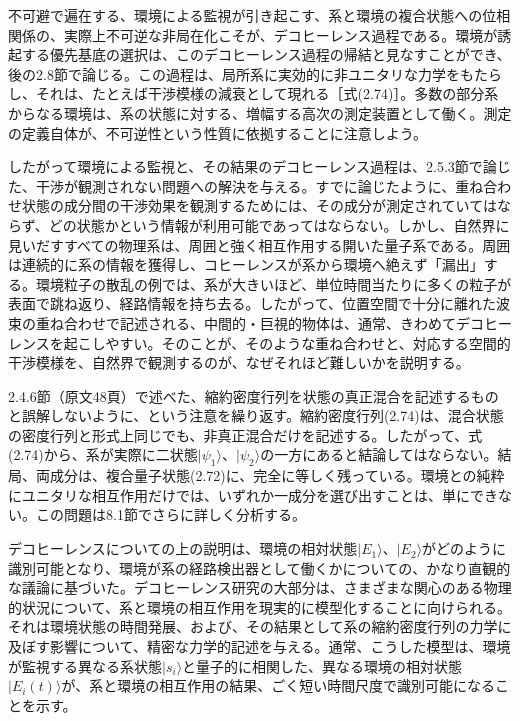 \hypertarget{srcpage:69}{}\label{srcpage:69}
不可避で遍在する、環境による監視が引き起こす、系と環境の複合状態への位相関係の、実際上不可逆な非局在化こそが、デコヒーレンス過程である。環境が誘起する優先基底の選択は、このデコヒーレンス過程の帰結と見なすことができ、後の2.8節で論じる。この過程は、局所系に実効的に非ユニタリな力学をもたらし、それは、たとえば干渉模様の減衰として現れる［式(2.74)］。多数の部分系からなる環境は、系の状態に対する、増幅する高次の測定装置として働く。測定の定義自体が、不可逆性という性質に依拠することに注意しよう。

したがって環境による監視と、その結果のデコヒーレンス過程は、2.5.3節で論じた、干渉が観測されない問題への解決を与える。すでに論じたように、重ね合わせ状態の成分間の干渉効果を観測するためには、その成分が測定されていてはならず、どの状態かという情報が利用可能であってはならない。しかし、自然界に見いだすすべての物理系は、周囲と強く相互作用する開いた量子系である。周囲は連続的に系の情報を獲得し、コヒーレンスが系から環境へ絶えず「漏出」する。環境粒子の散乱の例では、系が大きいほど、単位時間当たりに多くの粒子が表面で跳ね返り、経路情報を持ち去る。したがって、位置空間で十分に離れた波束の重ね合わせで記述される、中間的・巨視的物体は、通常、きわめてデコヒーレンスを起こしやすい。そのことが、そのような重ね合わせと、対応する空間的干渉模様を、自然界で観測するのが、なぜそれほど難しいかを説明する。

2.4.6節（原文48頁）で述べた、縮約密度行列を状態の真正混合を記述するものと誤解しないように、という注意を繰り返す。縮約密度行列(2.74)は、混合状態の密度行列と形式上同じでも、非真正混合だけを記述する。したがって、式(2.74)から、系が実際に二状態$\lvert\psi_1\rangle$、$\lvert\psi_2\rangle$の一方にあると結論してはならない。結局、両成分は、複合量子状態(2.72)に、完全に等しく残っている。環境との純粋にユニタリな相互作用だけでは、いずれか一成分を選び出すことは、単にできない。この問題は8.1節でさらに詳しく分析する。

デコヒーレンスについての上の説明は、環境の相対状態$\lvert E_1\rangle$、$\lvert E_2\rangle$がどのように識別可能となり、環境が系の経路検出器として働くかについての、かなり直観的な議論に基づいた。デコヒーレンス研究の大部分は、さまざまな関心のある物理的状況について、系と環境の相互作用を現実的に模型化することに向けられる。それは環境状態の時間発展、および、その結果として系の縮約密度行列の力学に及ぼす影響について、精密な力学的記述を与える。通常、こうした模型は、環境が監視する異なる系状態$\lvert s_i\rangle$と量子的に相関した、異なる環境の相対状態$\lvert E_i(t)\rangle$が、系と環境の相互作用の結果、ごく短い時間尺度で識別可能になることを示す。

